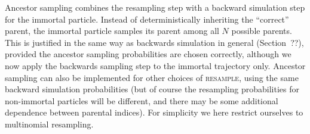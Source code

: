 Ancestor sampling combines the resampling step with a backward simulation step for the immortal particle. Instead of deterministically inheriting the ``correct'' parent, the immortal particle samples its parent among all $N$ possible parents.
This is justified in the same way as backwards simulation in general (Section~??), provided the ancestor sampling probabilities are chosen correctly, although we now apply the backwards sampling step to the immortal trajectory only.
Ancestor sampling can also be implemented for other choices of \textsc{resample}, using the same backward simulation probabilities (but of course the resampling probabilities for non-immortal particles will be different, and there may be some additional dependence between parental indices). For simplicity we here restrict ourselves to multinomial resampling.

